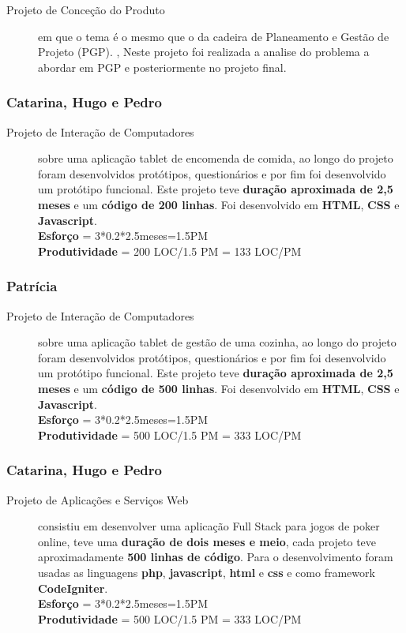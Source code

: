 \documentclass[a4paper]{report}
\begin{document}
\begin{description}
    \item[Projeto de Conceção do Produto] em que o tema é o mesmo que o da cadeira de Planeamento e Gestão de Projeto (PGP). , Neste projeto foi realizada a analise do problema a abordar em PGP e posteriormente no projeto final.
\end{description}

\subsubsection*{Catarina, Hugo e Pedro} 
\begin{description}
    \item[Projeto de Interação de Computadores] sobre uma aplicação tablet de encomenda de comida, ao longo do projeto foram desenvolvidos protótipos, questionários e por fim foi desenvolvido um protótipo funcional. Este projeto teve \textbf{duração aproximada de 2,5 meses} e um \textbf{código de 200 linhas}. Foi desenvolvido em \textbf{HTML}, \textbf{CSS} e \textbf{Javascript}.\\\textbf{Esforço} = 3*0.2*2.5meses=1.5PM\\ \textbf{Produtividade} = 200 LOC/1.5 PM = 133 LOC/PM
\end{description}

\subsubsection*{Patrícia} 
\begin{description}
    \item[Projeto de Interação de Computadores] sobre uma aplicação tablet de gestão de uma cozinha, ao longo do projeto foram desenvolvidos protótipos, questionários e por fim foi desenvolvido um protótipo funcional. Este projeto teve \textbf{duração aproximada de 2,5 meses} e um \textbf{código de 500 linhas}. Foi desenvolvido em \textbf{HTML}, \textbf{CSS} e \textbf{Javascript}.\\\textbf{Esforço} = 3*0.2*2.5meses=1.5PM\\ \textbf{Produtividade} = 500 LOC/1.5 PM = 333 LOC/PM
\end{description}

\subsubsection*{Catarina, Hugo e Pedro}
\begin{description}
    \item[Projeto de Aplicações e Serviços Web] consistiu em desenvolver uma aplicação Full Stack para jogos de poker online, teve uma \textbf{duração de dois meses e meio}, cada projeto teve aproximadamente \textbf{500 linhas de código}. Para o desenvolvimento foram usadas as linguagens \textbf{php}, \textbf{javascript}, \textbf{html} e \textbf{css} e como framework \textbf{CodeIgniter}.\\\textbf{Esforço} = 3*0.2*2.5meses=1.5PM\\ \textbf{Produtividade} = 500 LOC/1.5 PM = 333 LOC/PM
\end{description}
\end{document}
